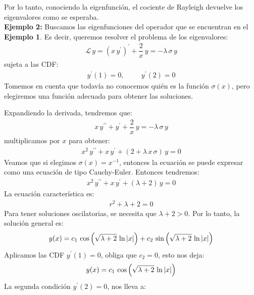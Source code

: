 \documentclass[12pt]{article}
\newcommand{\pderivada}[1]{\ensuremath{{#1}^{\prime}}}
\newcommand{\sderivada}[1]{\ensuremath{{#1}^{\prime \prime}}}
\numberwithin{equation}{section}
\begin{document}
Por lo tanto, conociendo la eigenfunción, el cociente de Rayleigh devuelve los eigenvalores como se esperaba.
\\[1em]
\noindent
\textbf{Ejemplo 2: } Buscamos las eigenfunciones del operador que se encuentran en el \textbf{Ejemplo 1}. Es decir, queremos resolver el problema de los eigenvalores:
\begin{align}
\mathcal{L} \, y = \left( x \, \pderivada{y} \right)^{\prime} + \dfrac{2}{x} \, y = - \lambda \, \sigma \, y
\label{eq:ecuacion_04_14}
\end{align}
sujeta a las CDF:
\begin{align*}
\pderivada{y} (1) = 0, \hspace{1cm} \pderivada{y}(2) = 0
\end{align*}
Tomemos en cuenta que todavía no conocemos quién es la función $\sigma (x)$, pero elegiremos una función adecuada para obtener las soluciones.
\par
\noindent
Expandiendo la derivada, tendremos que:
\begin{align*}
x \, \sderivada{y} + \pderivada{y} + \dfrac{2}{x} \, y = - \lambda \, \sigma \, y
\end{align*}
multiplicamos por $x$ para obtener:
\begin{align*}
x^{2} \, \sderivada{y} + x \, \pderivada{y} + (2 + \lambda \, x \,  \sigma) \, y = 0
\end{align*}
Veamos que si elegimos $\sigma(x) = x^{-1}$, entonces la ecuación se puede expresar como una ecuación de tipo Cauchy-Euler. Entonces tendremos:
\begin{align*}
x^{2} \, \sderivada{y} + x \, \pderivada{y} + (\lambda + 2) \, y = 0
\end{align*}
La ecuación característica es:
\begin{align*}
r^{2} + \lambda + 2 = 0
\end{align*}
Para tener soluciones oscilatorias, se necesita que $\lambda + 2 > 0$. Por lo tanto, la solución general es:
\begin{align}
y (x) = c_{1} \, \cos \left( \sqrt{\lambda + 2} \, \ln \abs{x} \right) + c_{2} \, \sin \left( \sqrt{\lambda + 2} \, \ln \abs{x} \right)
\label{eq:ecuacion_04_15}
\end{align}
Aplicamos las CDF $\pderivada{y}(1) = 0$, obliga que $c_{2} = 0$, esto nos deja:
\begin{align*}
y (x) = c_{1} \, \cos \left( \sqrt{\lambda + 2} \, \ln \abs{x} \right)
\end{align*}
La segunda condición $\pderivada{y}(2) = 0$, nos lleva a:
\end{document}
